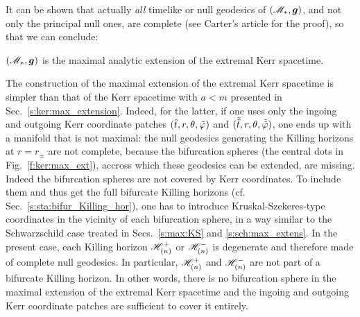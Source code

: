 It can be shown that actually \emph{all} timelike or null
geodesics of $(\mathscr{M}_*,\bm{g})$, and not only the principal null ones, are complete
(see Carter's article \cite{Carte68a} for the proof), so that we can conclude:
\begin{prop}
$(\mathscr{M}_*,\bm{g})$ is the maximal analytic extension of the
extremal Kerr spacetime.
\end{prop}

\begin{remark}
The construction of the maximal extension of the extremal Kerr spacetime
is simpler than that of the Kerr spacetime with $a<m$ presented
in Sec.~\ref{s:ker:max_extension}. Indeed, for the latter, if one uses
only the ingoing and outgoing Kerr coordinate patches $({\tilde t},r,\theta,{\tilde\varphi})$
and $(\tilde{{\tilde t}},r,\theta,\tilde{{\tilde\varphi}})$, one ends up with a manifold that
is not maximal: the null geodesics generating the Killing horizons
at $r=r_\pm$ are not complete, because the bifurcation spheres
(the central dots in Fig.~\ref{f:ker:max_ext}), accross which these geodesics
can be extended, are missing.
Indeed the bifurcation spheres are not covered by Kerr coordinates.
To include them and thus get the full bifurcate Killing horizons
(cf. Sec.~\ref{s:sta:bifur_Killing_hor}), one has to introduce Kruskal-Szekeres-type
coordinates in the vicinity of each bifurcation sphere, in a way similar to
the Schwarzschild case treated in Secs.~\ref{s:max:KS} and \ref{s:sch:max_extens}.
In the present case, each Killing horizon $\mathscr{H}^+_{(n)}$ or $\mathscr{H}^-_{(n)}$
is degenerate and therefore made of complete null geodesics. In particular,
$\mathscr{H}^+_{(n)}$ and $\mathscr{H}^-_{(n)}$ are not part of a bifurcate Killing horizon. In other words, there
is no bifurcation sphere in the maximal extension of the extremal Kerr spacetime
and the ingoing and outgoing Kerr coordinate patches
are sufficient to cover it entirely.
\end{remark}

